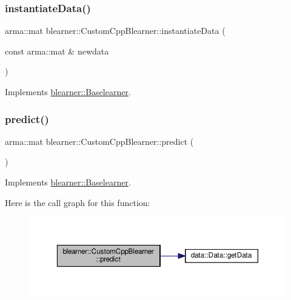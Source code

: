 \subsubsection{\texorpdfstring{instantiate\+Data()}{instantiateData()}}
{\footnotesize\ttfamily arma\+::mat blearner\+::\+Custom\+Cpp\+Blearner\+::instantiate\+Data (\begin{DoxyParamCaption}\item[{const arma\+::mat \&}]{newdata }\end{DoxyParamCaption})\hspace{0.3cm}{\ttfamily [virtual]}}



Implements \hyperlink{classblearner_1_1_baselearner_af01f1b8c4540927705ff79c3649489f7}{blearner\+::\+Baselearner}.

\mbox{\label{classblearner_1_1_custom_cpp_blearner_aa17db5f5627b8251b2d8484d92e783b9}} 
\subsubsection{\texorpdfstring{predict()}{predict()}\hspace{0.1cm}{\footnotesize\ttfamily [1/2]}}
{\footnotesize\ttfamily arma\+::mat blearner\+::\+Custom\+Cpp\+Blearner\+::predict (\begin{DoxyParamCaption}{ }\end{DoxyParamCaption})\hspace{0.3cm}{\ttfamily [virtual]}}



Implements \hyperlink{classblearner_1_1_baselearner_ab37986047db43c84420fef2cef7fc20d}{blearner\+::\+Baselearner}.

Here is the call graph for this function\+:\nopagebreak
\begin{figure}[H]
\begin{center}
\leavevmode
\includegraphics[width=350pt]{classblearner_1_1_custom_cpp_blearner_aa17db5f5627b8251b2d8484d92e783b9_cgraph}
\end{center}
\end{figure}
\mbox{\label{classblearner_1_1_custom_cpp_blearner_af2326171640e94c3a00f813781710208}} 
